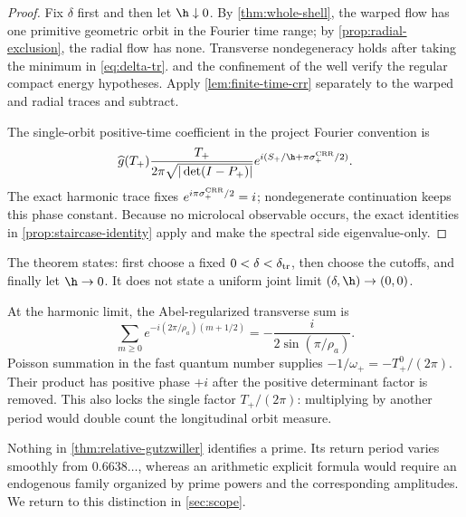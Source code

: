 \begin{proof}
Fix \(\delta\) first and then let \(\h\downarrow0\).  By
\cref{thm:whole-shell}, the warped flow has one primitive geometric orbit in
the Fourier time range; by \cref{prop:radial-exclusion}, the radial flow has
none.  Transverse nondegeneracy holds after taking the minimum in
\cref{eq:delta-tr}.   and the confinement of the
well verify the regular compact energy hypotheses.  Apply
\cref{lem:finite-time-crr} separately to the warped and radial traces and
subtract.

The single-orbit positive-time coefficient in the project Fourier convention is
\[
 \widehat g(T_+)
 \frac{T_+}{2\pi\sqrt{|\det(I-P_+)|}}
 e^{i(S_+/\h+\pi\sigma_+^{\rm CRR}/2)}.
\]
The exact harmonic trace fixes
\(e^{i\pi\sigma_+^{\rm CRR}/2}=i\); nondegenerate continuation keeps this
phase constant.  Because no microlocal observable occurs, the exact
identities in \cref{prop:staircase-identity} apply and make the spectral side
eigenvalue-only.
\end{proof}

\begin{remark}
\label{rem:quantifier-order}
The theorem states: first choose a fixed
\(0<\delta<\delta_{\rm tr}\), then choose the cutoffs, and finally let
\(\h\to0\).  It does not state a uniform joint limit
\((\delta,\h)\to(0,0)\).
\end{remark}

\begin{remark}
At the harmonic limit, the Abel-regularized transverse sum is
\[
 \sum_{m\ge0}e^{-i(2\pi/\rho_a)(m+1/2)}
 =-\frac{i}{2\sin(\pi/\rho_a)}.
\]
Poisson summation in the fast quantum number supplies
\(-1/\omega_+=-T_+^0/(2\pi)\).  Their product has positive phase \(+i\)
after the positive determinant factor is removed.  This also locks the
single factor \(T_+/(2\pi)\): multiplying by another period would double
count the longitudinal orbit measure.
\end{remark}

Nothing in \cref{thm:relative-gutzwiller} identifies a prime.  Its return
period varies smoothly from \(0.6638\ldots\), whereas an arithmetic explicit
formula would require an endogenous family organized by prime powers and
the corresponding amplitudes.  We return to this distinction in
\cref{sec:scope}.
